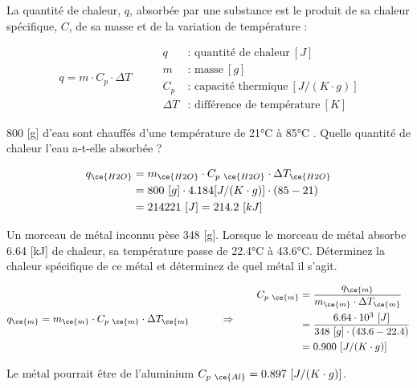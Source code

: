 \documentclass[
  11pt,
  french,
  a4paper,
  openany]{book}
\begin{document}
La quantité de chaleur, \(q\), absorbée par une substance est le produit de sa chaleur spécifique, \(C\), de sa masse et de la variation de température :

\[
\begin{split}
q = m \cdot C_p \cdot \Delta T
\end{split}
\qquad
\begin{split}
q & \text{: quantité de chaleur}\ [J] \\
m & \text{: masse}\ [g] \\
C_p & \text{: capacité thermique}\ [J/(K \cdot g)] \\
\Delta T & \text{: différence de température}\ [K]
\end{split}
\]

\begin{Exercise}

800 {[}g{]} d'eau sont chauffés d'une température de 21°C à 85°C . Quelle quantité de chaleur l'eau a-t-elle absorbée ?



\end{Exercise}

\begin{Answer}
\[
\begin{split}
q_{\ce{H2O}} &= m_{\ce{H2O}} \cdot C_{p\ \ce{H2O}} \cdot \Delta T_{\ce{H2O}} \\
 &= 800\ [g] \cdot 4.184 [J/(K \cdot g)] \cdot (85-21) \\
 &= 214221\ [J] =  214.2\ [kJ]
\end{split}
\]

\end{Answer}

\clearpage

\begin{Exercise}

Un morceau de métal inconnu pèse 348 {[}g{]}. Lorsque le morceau de métal absorbe 6.64 {[}kJ{]} de chaleur, sa température passe de 22.4°C à 43.6°C. Déterminez la chaleur spécifique de ce métal et déterminez de quel métal il s'agit.



\end{Exercise}

\begin{Answer}
\[
\begin{split}
q_{\ce{m}} &= m_{\ce{m}} \cdot C_{p\ \ce{m}} \cdot \Delta T_{\ce{m}}
\end{split}
\qquad \Rightarrow \qquad
\begin{split}
C_{p\ \ce{m}} &= \frac{q_{\ce{m}}}{m_{\ce{m}} \cdot \Delta T_{\ce{m}}} \\
 &= \frac{6.64 \cdot 10^3\ [J]}{348\ [g] \cdot (43.6 - 22.4)} \\
 &= 0.900\ [J/(K \cdot g)] \\
\end{split}
\]

Le métal pourrait être de l'aluminium \(C_{p\ \ce{Al}} = 0.897\ [J/(K \cdot g)]\).

\end{Answer}
\end{document}
